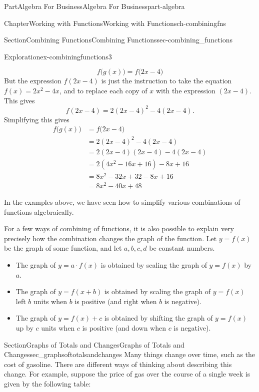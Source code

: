 \documentclass{tufte-book}
\numberwithin{equation}{chapter}
\newcommand{\amp}{&}
\begin{document}
\begin{partptx}{Part}{Algebra For Business}{}{Algebra For Business}{}{}{part-algebra}
\begin{chapterptx}{Chapter}{Working with Functions}{}{Working with Functions}{}{}{ch-combiningfns}
\begin{sectionptx}{Section}{Combining Functions}{}{Combining Functions}{}{}{sec-combining_functions}
\begin{exploration}{Exploration}{}{ex-combiningfunctions3}
\begin{enumerate}[font=\bfseries,label=(\alph*),ref=\alph*]
\begin{equation*}
f\Big(g(x)\Big) = f\Big(2x-4\Big)
\end{equation*}
But the expression \(f(2x-4)\) is just the instruction to take the equation \(f(x) = 2x^2-4x\), and to replace each copy of \(x\) with the expression \((2x-4)\). This gives%
\begin{equation*}
f(2x-4) = 2(2x-4)^2 - 4(2x-4)\text{.}
\end{equation*}
Simplifying this gives%
\begin{align*}
f\Big(g(x)\Big) \amp = f\Big(2x-4\Big) \\
\amp = 2(2x-4)^2 - 4(2x-4)\\
\amp = 2(2x-4)(2x-4) - 4(2x-4)\\
\amp = 2(4x^2-16x+16) - 8x + 16\\
\amp = 8x^2 -32x + 32 - 8x + 16\\
\amp = 8x^2 - 40x + 48 
\end{align*}
%
\end{enumerate}%
\end{exploration}%
In the examples above, we have seen how to simplify various combinations of functions algebraically.%
\par
For a few ways of combining of functions, it is also possible to explain very precisely how the combination changes the graph of the function. Let \(y = f(x)\) be the graph of some function, and let \(a,b,c,d\) be constant numbers.%
\begin{itemize}[label=\textbullet]
\item{}The graph of \(y = a\cdot f(x)\) is obtained by scaling the graph of \(y=f(x)\) by \(a\).%
\item{}The graph of \(y = f(x + b)\) is obtained by scaling the graph of \(y=f(x)\) left \(b\) units when \(b\) is positive (and right when \(b\) is negative).%
\item{}The graph of \(y = f(x) + c\) is obtained by shifting the graph of \(y=f(x)\) up by \(c\) units when \(c\) is positive (and down when \(c\) is negative).%
\end{itemize}
%
\end{sectionptx}
%
%
\typeout{************************************************}
\typeout{************************************************}
%
\begin{sectionptx}{Section}{\textasteriskcentered{}Graphs of Totals and Changes}{}{\textasteriskcentered{}Graphs of Totals and Changes}{}{}{sec_graphsoftotalsandchanges}
Many things change over time, such as the cost of gasoline. There are different ways of thinking about describing this change. For example, suppose the price of gas over the course of a single week is given by the following table:%

\end{sectionptx}
\end{chapterptx}
\end{partptx}
\end{document}
